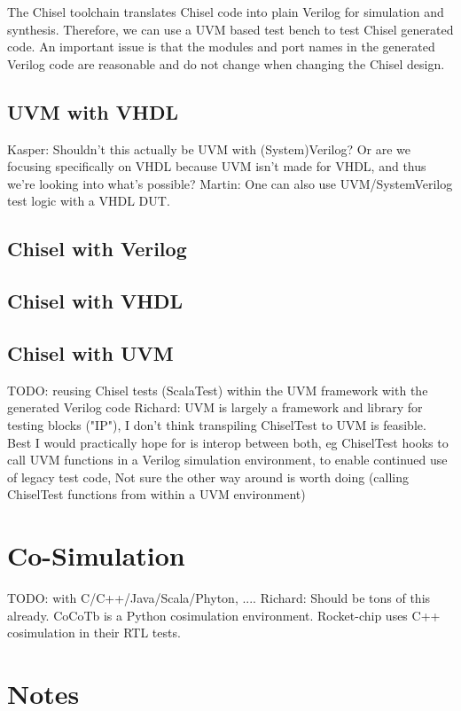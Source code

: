 \documentclass[conference]{IEEEtran}
\newcommand{\todo}[1]{{\color{olive} TODO: #1}}
\newcommand{\martin}[1]{{\color{blue} Martin: #1}}
\newcommand{\ducky}[1]{{\color{orange} Richard: #1}}
\newcommand{\kasper}[1]{{\color{purple} Kasper: #1}}
\begin{document}
The Chisel toolchain translates Chisel code into plain Verilog for simulation and
synthesis. Therefore, we can use a UVM based test bench to test Chisel generated code.
An important issue is that the modules and port names in the generated Verilog
code are reasonable and do not change when changing the Chisel design.

\subsection{UVM with VHDL}
\kasper{Shouldn't this actually be UVM with (System)Verilog? Or are we focusing specifically on VHDL because UVM isn't made for VHDL, and thus we're looking into what's possible?}
\martin{One can also use UVM/SystemVerilog test logic with a VHDL DUT.}

\subsection{Chisel with Verilog}

\subsection{Chisel with VHDL}

\subsection{Chisel with UVM}

\todo{reusing Chisel tests (ScalaTest) within the UVM framework
with the generated Verilog code}
\ducky{UVM is largely a framework and library for testing blocks ("IP"), I don't think transpiling ChiselTest to UVM is feasible. Best I would practically hope for is interop between both, eg ChiselTest hooks to call UVM functions in a Verilog simulation environment, to enable continued use of legacy test code, Not sure the other way around is worth doing (calling ChiselTest functions from within a UVM environment)}

\section{Co-Simulation}

\todo{with C/C++/Java/Scala/Phyton, ....}
\ducky{Should be tons of this already. CoCoTb is a Python cosimulation environment. Rocket-chip uses C++ cosimulation in their RTL tests.}


\section{Notes}
\end{document}
